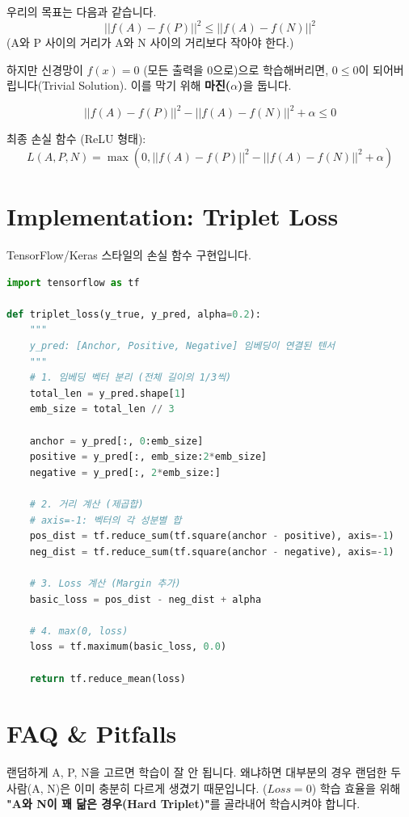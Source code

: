 \documentclass[11pt,a4paper]{book}
\theoremstyle{definition}
\begin{document}
\begin{mathbox}[title={Loss Function Derivation}]
우리의 목표는 다음과 같습니다.
$$ ||f(A) - f(P)||^2 \le ||f(A) - f(N)||^2 $$
(A와 P 사이의 거리가 A와 N 사이의 거리보다 작아야 한다.)

하지만 신경망이 $f(x)=0$ (모든 출력을 0으로)으로 학습해버리면, $0 \le 0$이 되어버립니다(Trivial Solution). 이를 막기 위해 \textbf{마진($\alpha$)}을 둡니다.

$$ ||f(A) - f(P)||^2 - ||f(A) - f(N)||^2 + \alpha \le 0 $$

최종 손실 함수 (ReLU 형태):
$$ L(A, P, N) = \max(0, ||f(A) - f(P)||^2 - ||f(A) - f(N)||^2 + \alpha) $$
\end{mathbox}

\section{Implementation: Triplet Loss}

TensorFlow/Keras 스타일의 손실 함수 구현입니다.

\begin{lstlisting}[language=Python, caption=Triplet Loss Function, breaklines=true]
import tensorflow as tf

def triplet_loss(y_true, y_pred, alpha=0.2):
    """
    y_pred: [Anchor, Positive, Negative] 임베딩이 연결된 텐서
    """
    # 1. 임베딩 벡터 분리 (전체 길이의 1/3씩)
    total_len = y_pred.shape[1]
    emb_size = total_len // 3
    
    anchor = y_pred[:, 0:emb_size]
    positive = y_pred[:, emb_size:2*emb_size]
    negative = y_pred[:, 2*emb_size:]
    
    # 2. 거리 계산 (제곱합)
    # axis=-1: 벡터의 각 성분별 합
    pos_dist = tf.reduce_sum(tf.square(anchor - positive), axis=-1)
    neg_dist = tf.reduce_sum(tf.square(anchor - negative), axis=-1)
    
    # 3. Loss 계산 (Margin 추가)
    basic_loss = pos_dist - neg_dist + alpha
    
    # 4. max(0, loss)
    loss = tf.maximum(basic_loss, 0.0)
    
    return tf.reduce_mean(loss)
\end{lstlisting}

\section{FAQ \& Pitfalls}

\begin{warningbox}[title={Hard Triplet Mining (학습 데이터 선정)}]
랜덤하게 A, P, N을 고르면 학습이 잘 안 됩니다. 왜냐하면 대부분의 경우 랜덤한 두 사람(A, N)은 이미 충분히 다르게 생겼기 때문입니다. ($Loss=0$)
학습 효율을 위해 \textbf{"A와 N이 꽤 닮은 경우(Hard Triplet)"}를 골라내어 학습시켜야 합니다.
\end{warningbox}
\end{document}
